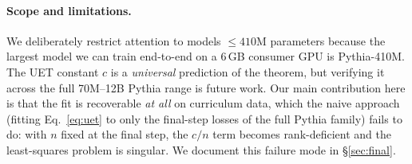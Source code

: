 \paragraph{Scope and limitations.}
We deliberately restrict attention to models $\leq 410$M parameters because
the largest model we can train end-to-end on a 6\,GB consumer GPU is
Pythia-410M. The UET constant $c$ is a \emph{universal} prediction of the
theorem, but verifying it across the full 70M--12B Pythia range is
future work. Our main contribution here is that the fit is recoverable
\emph{at all} on curriculum data, which the naive approach (fitting
Eq.~\eqref{eq:uet} to only the final-step losses of the full Pythia family)
fails to do: with $n$ fixed at the final step, the $c/n$ term becomes
rank-deficient and the least-squares problem is singular. We document this
failure mode in \S\ref{sec:final}.
